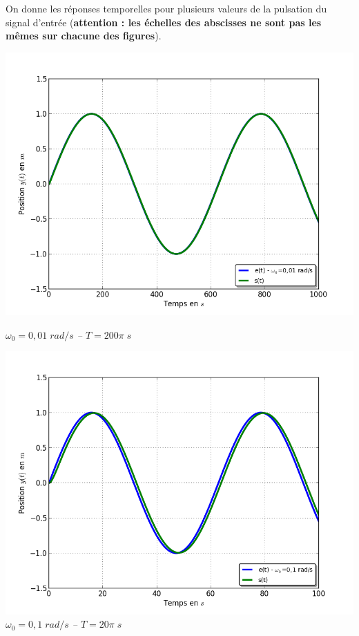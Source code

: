 \documentclass[10pt,oneside]{article}
\begin{document}
On donne les réponses temporelles pour plusieurs valeurs de la pulsation du signal d'entrée (\textbf{attention : les échelles des abscisses ne sont pas les mêmes sur chacune des figures}).

\begin{minipage}[c]{.24\linewidth}
\begin{center}
\includegraphics[width=\textwidth]{png/sinus_om001.png}

\textit{$\omega_0 =  0,01\; rad/s $ -- $T = 200 \pi \; s$}
\end{center}
\end{minipage}\hfill
\begin{minipage}[c]{.24\linewidth}
\begin{center}
\includegraphics[width=\textwidth]{png/sinus_om01}
\textit{$\omega_0 =  0,1\; rad/s $ -- $ T = 20 \pi \; s$}
\end{center}
\end{minipage}\hfill
\end{document}
